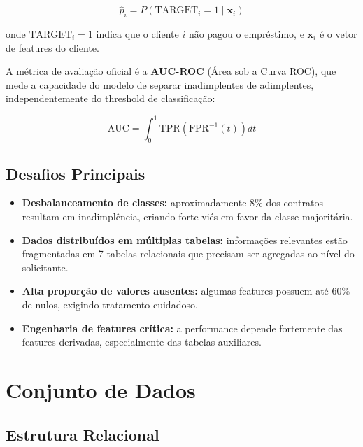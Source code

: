 \documentclass[12pt, a4paper]{article}
\begin{document}
\begin{equation}
    \hat{p}_i = P(\text{TARGET}_i = 1 \mid \mathbf{x}_i)
\end{equation}

onde $\text{TARGET}_i = 1$ indica que o cliente $i$ n\~ao pagou o empr\'estimo, e
$\mathbf{x}_i$ \'e o vetor de features do cliente.

A m\'etrica de avalia\c{c}\~ao oficial \'e a \textbf{AUC-ROC} (\'Area sob a Curva ROC),
que mede a capacidade do modelo de separar inadimplentes de adimplentes,
independentemente do threshold de classifica\c{c}\~ao:

\begin{equation}
    \text{AUC} = \int_0^1 \text{TPR}\!\left(\text{FPR}^{-1}(t)\right) dt
\end{equation}

\subsection{Desafios Principais}

\begin{itemize}
    \item \textbf{Desbalanceamento de classes:} aproximadamente 8\% dos contratos resultam
          em inadimpl\^encia, criando forte vi\'es em favor da classe majorit\'aria.
    \item \textbf{Dados distribu\'idos em m\'ultiplas tabelas:} informa\c{c}\~oes relevantes
          est\~ao fragmentadas em 7 tabelas relacionais que precisam ser agregadas ao n\'ivel
          do solicitante.
    \item \textbf{Alta propor\c{c}\~ao de valores ausentes:} algumas features possuem at\'e
          60\% de nulos, exigindo tratamento cuidadoso.
    \item \textbf{Engenharia de features cr\'itica:} a performance depende fortemente das
          features derivadas, especialmente das tabelas auxiliares.
\end{itemize}

\section{Conjunto de Dados}

\subsection{Estrutura Relacional}
\end{document}

